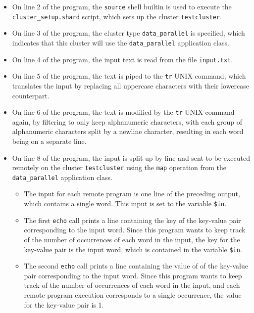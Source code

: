 \documentclass[oneside]{report}
\begin{document}
\begin{itemize}
  \item
        \begin{sloppypar}
          On line 2 of the program, the \texttt{source} shell builtin is used to execute the \texttt{cluster\_setup.shard} script, which sets up the cluster \texttt{testcluster}.
        \end{sloppypar}
  \item On line 3 of the program, the cluster type \texttt{data\_parallel} is specified, which indicates that this cluster will use the \texttt{data\_parallel} application class.
  \item
        On line 4 of the program, the input text is read from the file \texttt{input.txt}.
  \item
        On line 5 of the program, the text is piped to the \texttt{tr} UNIX command, which translates the input by replacing all uppercase characters with their lowercase counterpart.
  \item
        On line 6 of the program, the text is modified by the \texttt{tr} UNIX command again, by filtering to only keep alphanumeric characters, with each group of alphanumeric characters split by a newline character, resulting in each word being on a separate line.
  \item
        On line 8 of the program, the input is split up by line and sent to be executed remotely on the cluster \texttt{testcluster} using the \texttt{map} operation from the \texttt{data\_parallel} application class.
        \begin{itemize}
          \item The input for each remote program is one line of the preceding output, which contains a single word. This input is set to the variable \texttt{\$in}.
          \item The first \texttt{echo} call prints a line containing the key of the key-value pair corresponding to the input word.
                Since this program wants to keep track of the number of occurrences of each word in the input, the key for the key-value pair is the input word, which is contained in the variable \texttt{\$in}.
          \item The second \texttt{echo} call prints a line containing the value of of the key-value pair corresponding to the input word.
                Since this program wants to keep track of the number of occurrences of each word in the input, and each remote program execution corresponds to a single occurrence, the value for the key-value pair is 1.
        \end{itemize}


\end{itemize}
\end{document}
